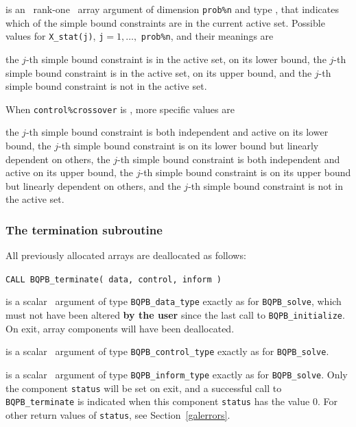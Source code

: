\documentclass{galahad}
\newcommand{\packagename}{BQPB}
\begin{document}
\begin{description}
 is an \optional\ rank-one \intentout\ array argument of
dimension {\tt prob\%n}
and type \integer, that indicates which of the simple bound
constraints are in the current active set. Possible values for
{\tt X\_stat(j)}, {\tt j}$=1, \ldots ,$ {\tt prob\%n}, and their meanings are
\begin{description}
 the $j$-th simple bound constraint
is in the active set, on its lower bound,
 the $j$-th simple bound constraint
is in the active set, on its upper bound, and
  the $j$-th simple bound constraint is not in the active set.
\end{description}
When {\tt control\%crossover} is \true, more specific values are
\begin{description}
 the $j$-th simple bound constraint
is both independent and active on its lower bound,
 the $j$-th simple bound constraint
is on its lower bound but linearly dependent on others,
 the $j$-th simple bound constraint
is both independent and active on its upper bound,
 the $j$-th simple bound constraint
is on its upper bound but linearly dependent on others, and
 the $j$-th simple bound constraint is not in the active set.
\end{description}

\end{description}


\subsubsection{The  termination subroutine}
All previously allocated arrays are deallocated as follows:
\vspace*{1mm}

\hspace{8mm}
{\tt CALL \packagename\_terminate( data, control, inform )}

\vspace*{-3mm}
\begin{description}

 is a scalar \intentinout\ argument of type
{\tt \packagename\_data\_type}
exactly as for
{\tt \packagename\_solve},
which must not have been altered {\bf by the user} since the last call to
{\tt \packagename\_initialize}.
On exit, array components will have been deallocated.

 is a scalar \intentin\ argument of type
{\tt \packagename\_control\_type}
exactly as for
{\tt \packagename\_solve}.

 is a scalar \intentout\ argument of type
{\tt \packagename\_inform\_type}
exactly as for
{\tt \packagename\_solve}.
Only the component {\tt status} will be set on exit, and a
successful call to
{\tt \packagename\_terminate}
is indicated when this  component {\tt status} has the value 0.
For other return values of {\tt status}, see Section~\ref{galerrors}.

\end{description}
\end{document}
